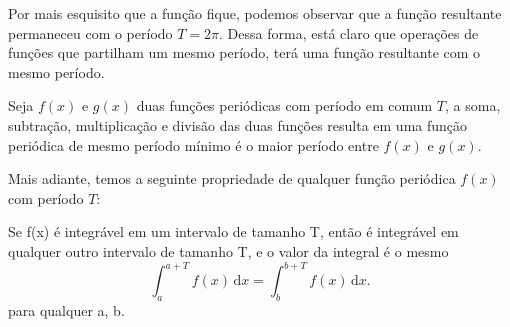 Por mais esquisito que a função fique, podemos observar que a função resultante
permaneceu com o período $T = 2\pi$. Dessa forma, está claro que operações 
de funções que partilham um mesmo período, terá uma função resultante com o mesmo
período.\\

\begin{definicao}
    Seja $f(x)$ e $g(x)$ duas funções periódicas com período em comum $T$, a soma, subtração,
    multiplicação e divisão das duas funções resulta em uma função periódica de 
    mesmo período mínimo é o maior período entre $f(x)$ e $g(x)$.
\end{definicao}

Mais adiante, temos a seguinte propriedade de qualquer função periódica $f(x)$
com período $T$:\\
\begin{definicao}
Se f(x) é integrável em um intervalo de tamanho T,
então é integrável em qualquer outro intervalo de tamanho T, e o valor da integral
é o mesmo\\
\begin{equation}
\label{int_prop1}
    \int_a^{a+T} \! f(x) \, \mathrm{d}x = \int_b^{b+T} \! f(x) \, \mathrm{d}x.
\end{equation}
para qualquer a, b. \\
\label{def:functPer}
\end{definicao}


